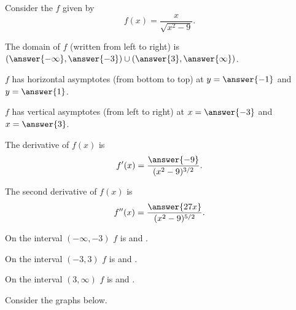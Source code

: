 \documentclass{ximera}
\author{Nela Lakos \and Kyle Parsons}
\begin{document}
\begin{exercise}
Consider the $f$ given by
\[
f(x) = \frac{x}{\sqrt{x^2-9}}.
\]

The domain of $f$ (written from left to right) is $\left(\answer{-\infty},\answer{-3}\right)\cup\left(\answer{3},\answer{\infty}\right)$.

$f$ has horizontal asymptotes (from bottom to top) at $y=\answer{-1}$ and $y=\answer{1}$.

$f$ has vertical asymptotes (from left to right) at $x=\answer{-3}$ and $x=\answer{3}$.

The derivative of $f(x)$ is
\[
f'(x) =\frac{ \answer{-9}}{(x^2-9)^{3/2}}.
\]

The second derivative of $f(x)$ is
\[
f''(x) =\frac{\answer{27x}}{(x^2-9)^{5/2}}.
\]

On the interval $(-\infty,-3)$ $f$ is  and .

On the interval $(-3,3)$ $f$ is  and .

On the interval $(3,\infty)$ $f$ is  and .

Consider the graphs below.



\end{exercise}
\end{document}
